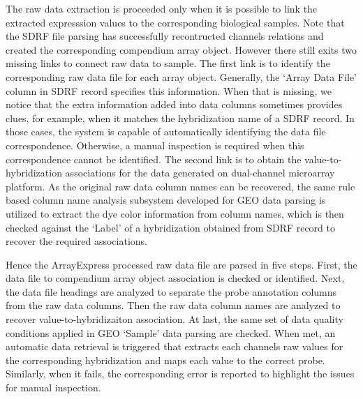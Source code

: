 The raw data extraction is proceeded only when it is possible to link the
extracted expresssion values to the corresponding biological samples.
%
Note that the SDRF file parsing has successfully recontructed channels
relations and created the corresponding compendium array object.
%
However there still exits two missing links to connect raw data to sample.
%
The first link is to identify the corresponding raw data file for each array
object.  Generally, the `Array Data File' column in SDRF record specifies
this information.
%
When that is missing, we notice that the extra information added into
data columns sometimes provides clues, for example, when it matches the
hybridization name of a SDRF record.
%
In those cases, the system is capable of automatically identifying the data
file correspondence.
%
Otherwise, a manual inspection is required when this correspondence cannot be
identified.
%
The second link is to obtain the value-to-hybridization associations for the
data generated on dual-channel microarray platform.
%
As the original raw data column names can be recovered, the same rule based
column name analysis subsystem developed for GEO data parsing is utilized to
extract the dye color information from column names, which is then checked
against the `Label' of a hybridization obtained from SDRF record to recover
the required associations.

Hence the ArrayExpress processed raw data file are parsed in five steps.
%
First, the data file to compendium array object association is checked or
identified.  Next, the data file headings are analyzed to separate the probe
annotation columns from the raw data columns.  Then the raw data column names
are analyzed to recover value-to-hybridizaiton association.  At last, the same
set of data quality conditions applied in GEO `Sample' data parsing are
checked.  When met, an automatic data retrieval is triggered that extracts
each channels raw values for the corresponding hybridization and maps each
value to the correct probe.
%
Similarly, when it fails, the corresponding error is reported to highlight the
issues for manual inspection.




